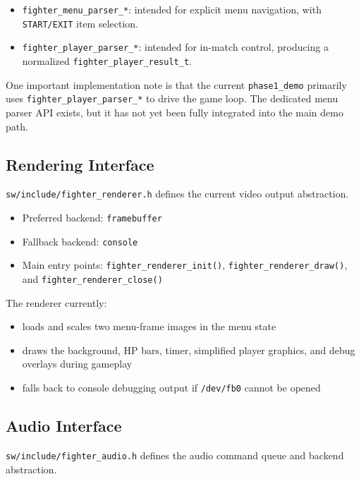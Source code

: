 \documentclass[12pt,a4paper]{article}
\begin{document}
\begin{itemize}
  \item \texttt{fighter\_menu\_parser\_*}: intended for explicit menu navigation, with \texttt{START/EXIT} item selection.
  \item \texttt{fighter\_player\_parser\_*}: intended for in-match control, producing a normalized \texttt{fighter\_player\_result\_t}.
\end{itemize}

One important implementation note is that the current \texttt{phase1\_demo} primarily uses \texttt{fighter\_player\_parser\_*} to drive the game loop. The dedicated menu parser API exists, but it has not yet been fully integrated into the main demo path.

\subsection{Rendering Interface}

\texttt{sw/include/fighter\_renderer.h} defines the current video output abstraction.

\begin{itemize}
  \item Preferred backend: \texttt{framebuffer}
  \item Fallback backend: \texttt{console}
  \item Main entry points: \texttt{fighter\_renderer\_init()}, \texttt{fighter\_renderer\_draw()}, and \texttt{fighter\_renderer\_close()}
\end{itemize}

The renderer currently:

\begin{itemize}
  \item loads and scales two menu-frame images in the menu state
  \item draws the background, HP bars, timer, simplified player graphics, and debug overlays during gameplay
  \item falls back to console debugging output if \texttt{/dev/fb0} cannot be opened
\end{itemize}

\subsection{Audio Interface}

\texttt{sw/include/fighter\_audio.h} defines the audio command queue and backend abstraction.
\end{document}
